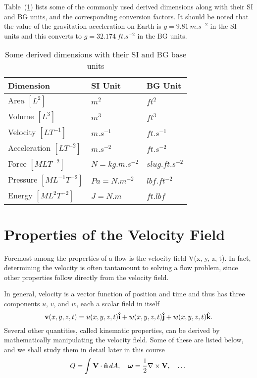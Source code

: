 \documentclass[11pt]{penrose}
\begin{document}
Table~(\ref{tab:derived-dimensions}) lists some of the commonly used derived dimensions along with their SI and BG units, and the corresponding conversion factors. It should be noted that the value of the gravitation acceleration on Earth is $g = \SI{9.81}{m.s^{-2}}$ in the SI units and this converts to $g = \SI{32.174}{ft.s^{-2}}$ in the BG units.
\begin{table}[htb]
    \caption{Some derived dimensions with their SI and BG base units}
    \label{tab:derived-dimensions}
    \centering
    \begin{tabularx}{\textwidth}{Xp{35mm}p{35mm}}
        \toprule
        Dimension & SI Unit & BG Unit \\
        \midrule
        Area $[L^2]$ & $\si{m^2}$ & $\si{ft^2}$ \\
        Volume $[L^3]$ & $\si{m^3}$ & $\si{ft^3}$ \\
        Velocity $[LT^{-1}]$ & $\si{m.s^{-1}}$ & $\si{ft.s^{-1}}$ \\
        Acceleration $[LT^{-2}]$ & $\si{m.s^{-2}}$ & $\si{ft.s^{-2}}$ \\
        Force $[MLT^{-2}]$ & $\si{N}=\si{kg.m.s^{-2}}$ & $\si{slug.ft.s^{-2}}$ \\
        Pressure $[ML^{-1}T^{-2}]$ & $\si{Pa}=\si{N.m^{-2}}$ & $\si{lbf.ft^{-2}}$ \\
        Energy $[ML^{2}T^{-2}]$ & $\si{J}=\si{N.m}$ & $\si{ft.lbf}$ \\
        \bottomrule
    \end{tabularx}
\end{table}

\section{Properties of the Velocity Field}
Foremost among the properties of a flow is the velocity field V(x, y, z, t). In fact, determining the velocity is often tantamount to solving a flow problem, since other properties follow directly from the velocity field.

In general, velocity is a vector function of position and time and thus has three components $u$, $v$, and $w$, each a scalar field in itself
\begin{equation}
    \boldsymbol{\mathbf{v}}(x,y,z,t) = u(x,y,z,t) \boldsymbol{\mathbf{\hat{i}}} + w(x,y,z,t) \boldsymbol{\mathbf{\hat{j}}} + w(x,y,z,t) \boldsymbol{\mathbf{\hat{k}}}.
\end{equation}
Several other quantities, called kinematic properties, can be derived by mathematically manipulating the velocity field. Some of these are listed below, and we shall study them in detail later in this course
\begin{equation*}
    Q = \int \boldsymbol{\mathbf{V}} \cdot \boldsymbol{\mathbf{\hat{n}}} \,dA,
    \quad
    \boldsymbol{\mathbf{\omega}} = \frac{1}{2} \nabla \times \boldsymbol{\mathbf{V}},
    \quad
    \dots
\end{equation*}

\end{document}
